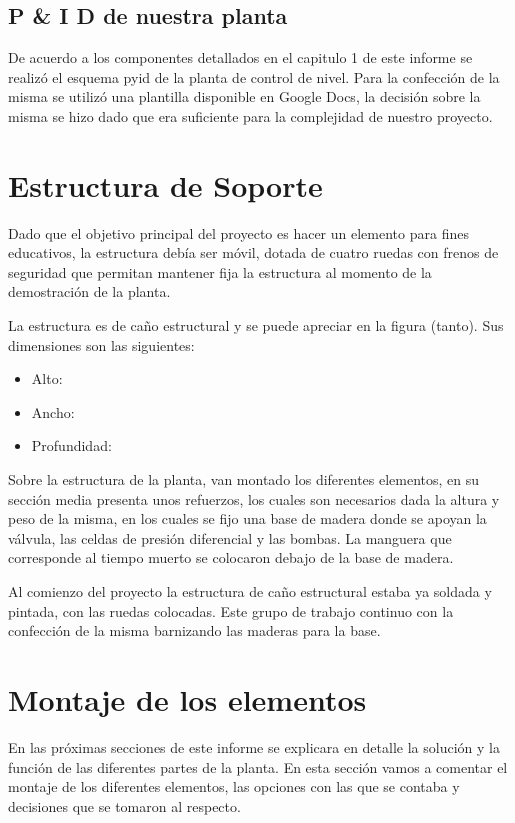 \subsection{P \& I D de nuestra planta}
De acuerdo a los componentes detallados en el capitulo 1 de este informe se realizó el esquema \gls{pyid}
de la planta de control de nivel. Para la confección de la misma se utilizó una plantilla disponible
en Google Docs, la decisión sobre la misma se hizo dado que era suficiente para la complejidad de
nuestro proyecto.

\section{Estructura de Soporte}
\label{sec:EstructuraSoporte}

Dado que el objetivo principal del proyecto es hacer un elemento para fines educativos, la estructura
debía ser móvil, dotada de cuatro ruedas con frenos de seguridad que permitan mantener fija la estructura
al momento de la demostración de la planta.

La estructura es de caño estructural  y se puede apreciar en la figura
(tanto).
Sus dimensiones son las siguientes:

 \begin{itemize}
  \item Alto:
  \item Ancho:
  \item Profundidad:
 \end{itemize}
 Sobre la estructura de la planta, van montado los diferentes elementos, en su sección 
 media presenta unos refuerzos, los cuales son necesarios dada la altura y peso de la misma, en 
 los cuales se fijo una base de madera donde se apoyan la válvula, las celdas de presión diferencial
 y las bombas. La manguera que corresponde al tiempo muerto se colocaron debajo de la base de madera.
 
 Al comienzo del proyecto la estructura de caño estructural estaba ya soldada y pintada, con las ruedas
 colocadas. Este grupo de trabajo continuo con la confección de la misma barnizando las maderas para la
 base.
\section{Montaje de los elementos}
En las próximas secciones de este informe se explicara en detalle la solución y la función de las diferentes
partes de la planta. En esta sección vamos a comentar el montaje de los diferentes elementos, las 
opciones con las que se contaba y decisiones que se tomaron al respecto. 

